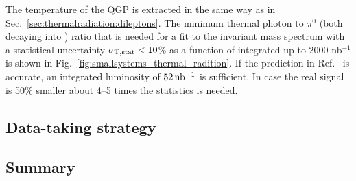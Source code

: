 \documentclass[../report.tex]{subfiles}
\begin{document}
The temperature of the QGP is extracted in the same way as in Sec.~\ref{sec:thermalradiation:dileptons}. The minimum thermal photon to $\pi^{0}$ (both decaying into \Pepem) ratio that is needed for a fit to the invariant mass spectrum with a statistical uncertainty $\sigma_{\rm T,stat} < 10$\% as a function of integrated up to 2000 nb$^{-1}$ is shown in Fig.~\ref{fig:smallsystems_thermal_radition}. If the prediction in Ref.~\cite{RappPriv1} is accurate, an integrated luminosity of $\unit[52]{nb^{-1}}$ is sufficient. In case the real signal is 50\% smaller about 4--5 times the statistics is needed.

\subsection{Data-taking strategy}


\subsection{Summary}
\end{document}
